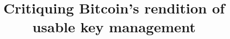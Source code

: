 \documentclass{sig-alternate}
\begin{document}
\title{Critiquing Bitcoin's rendition of usable key management}


\maketitle







%
%
%
%
%
%
%
%
%
%
%




\nocite{*}


\balancecolumns
\end{document}
